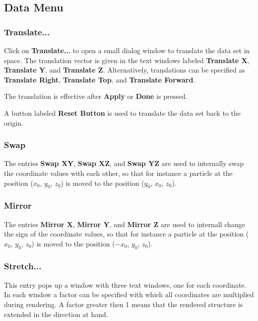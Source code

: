 \documentclass[11pt]{article}
\begin{document}
\subsection{Data Menu}

\subsubsection{Translate...}

Click on {\bf Translate...} to open a small dialog window to translate 
the data set in space.  The translation vector is given in the text windows
labeled {\bf Translate X}, {\bf Translate Y}, and {\bf Translate Z}.  
Alternatively, translations can be specified as {\bf Translate Right}, 
{\bf Translate Top}, and {\bf Translate Forward}.  

The translation is effective after {\bf Apply} or {\bf Done} is pressed.

A button labeled {\bf Reset Button} is used to translate the data set 
back to the origin.

\subsubsection{Swap}

The entries {\bf Swap XY}, {\bf Swap XZ}, and {\bf Swap YZ} are used 
to internally swap the coordinate values with each other, so that for 
instance a particle at the position ($x_0$, $y_0$, $z_0$) is moved to 
the position ($y_0$, $x_0$, $z_0$). 

\subsubsection{Mirror}

The entries {\bf Mirror X}, {\bf Mirror Y}, and {\bf Mirror Z} are used 
to internall change the sign of the coordinate values, so that for 
instance a particle at the position ($x_0$, $y_0$, $z_0$) is moved to 
the position ($-x_0$, $y_0$, $z_0$). 

\subsubsection{Stretch...}

This entry pops up a window with three text windows, one for each 
coordinate.  In each window a factor can be specified with which 
all coordinates are multiplied during rendering.  A factor greater
then 1 means that the rendered structure is extended in the direction
at hand. 
\end{document}
